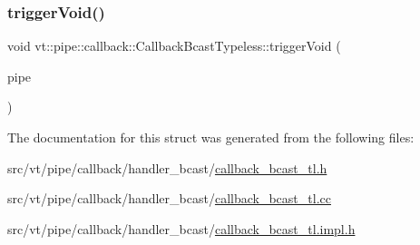 \subsubsection{\texorpdfstring{trigger\+Void()}{triggerVoid()}}
{\footnotesize\ttfamily void vt\+::pipe\+::callback\+::\+Callback\+Bcast\+Typeless\+::trigger\+Void (\begin{DoxyParamCaption}\item[{\hyperlink{namespacevt_ac9852acda74d1896f48f406cd72c7bd3}{Pipe\+Type} const \&}]{pipe }\end{DoxyParamCaption})}



The documentation for this struct was generated from the following files\+:\begin{DoxyCompactItemize}
\item 
src/vt/pipe/callback/handler\+\_\+bcast/\hyperlink{callback__bcast__tl_8h}{callback\+\_\+bcast\+\_\+tl.\+h}\item 
src/vt/pipe/callback/handler\+\_\+bcast/\hyperlink{callback__bcast__tl_8cc}{callback\+\_\+bcast\+\_\+tl.\+cc}\item 
src/vt/pipe/callback/handler\+\_\+bcast/\hyperlink{callback__bcast__tl_8impl_8h}{callback\+\_\+bcast\+\_\+tl.\+impl.\+h}\end{DoxyCompactItemize}
